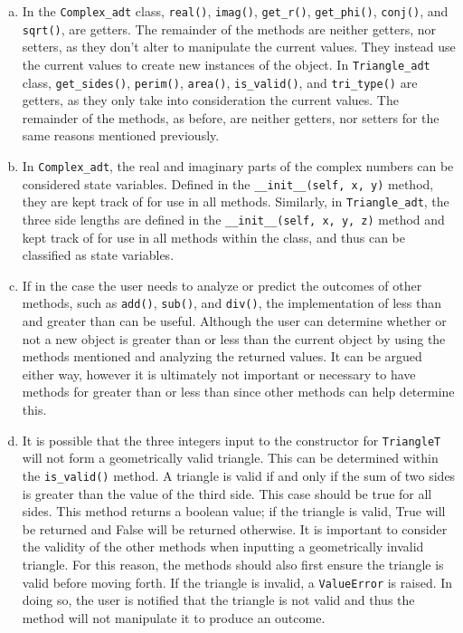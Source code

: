 \documentclass[12pt]{article}
\begin{document}
\begin{enumerate}[(a)]
\item In the \verb|Complex_adt| class, \verb|real()|, \verb|imag()|, \verb|get_r()|, \verb|get_phi()|, \verb|conj()|, and \verb|sqrt()|, are getters. The remainder of the methods are neither getters, nor setters, as they don’t alter to manipulate the current values. They instead use the current values to create new instances of the object. In \verb|Triangle_adt| class, \verb|get_sides()|, \verb|perim()|, \verb|area()|, \verb|is_valid()|, and \verb|tri_type()| are getters, as they only take into consideration the current values. The remainder of the methods, as before, are neither getters, nor setters for the same reasons mentioned previously.

\item In \verb|Complex_adt|, the real and imaginary parts of the complex numbers can be considered state variables. Defined in the \verb|__init__(self, x, y)| method, they are kept track of for use in all methods. Similarly, in \verb|Triangle_adt|, the three side lengths are defined in the \verb|__init__(self, x, y, z)| method and kept track of for use in all methods within the class, and thus can be classified as state variables.


\item If in the case the user needs to analyze or predict the outcomes of other methods, such as \verb|add()|, \verb|sub()|, and \verb|div()|, the implementation of less than and greater than can be useful. Although the user can determine whether or not a new object is greater than or less than the current object by using the methods mentioned and analyzing the returned values. It can be argued either way, however it is ultimately not important or necessary to have methods for greater than or less than since other methods can help determine this.

\item It is possible that the three integers input to the constructor for \verb|TriangleT| will not form a geometrically valid triangle. This can be determined within the \verb|is_valid()| method. A triangle is valid if and only if the sum of two sides is greater than the value of the third side. This case should be true for all sides. This method returns a boolean value; if the triangle is valid, True will be returned and False will be returned otherwise. It is important to consider the validity of the other methods when inputting a geometrically invalid triangle. For this reason, the methods should also first ensure the triangle is valid before moving forth. If the triangle is invalid, a \verb|ValueError| is raised. In doing so, the user is notified that the triangle is not valid and thus the method will not manipulate it to produce an outcome. 


\end{enumerate}
\end{document}
